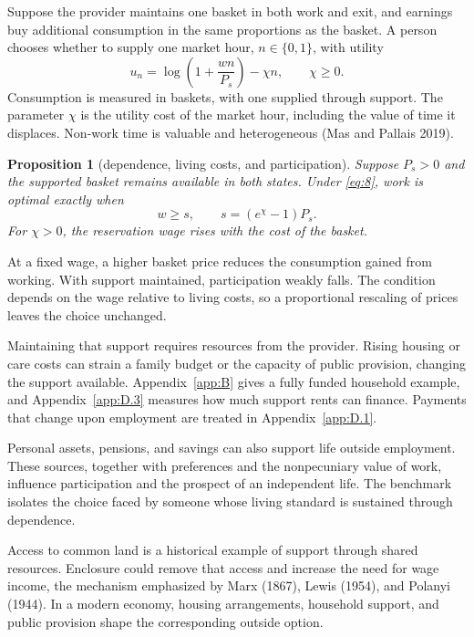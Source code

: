 \documentclass[12pt]{article}
\theoremstyle{plain}
\newtheorem{proposition}{Proposition}
\begin{document}
Suppose the provider maintains one basket in both work and exit, and earnings buy additional consumption in the same proportions as the basket. A person chooses whether to supply one market hour, $n\in\{0,1\}$, with utility
\begin{equation}\label{eq:8}
u_n = \log\left(1+\frac{wn}{P_s}\right) - \chi n,
\qquad
\chi\ge0.
\end{equation}
Consumption is measured in baskets, with one supplied through support. The parameter $\chi$ is the utility cost of the market hour, including the value of time it displaces. Non-work time is valuable and heterogeneous (Mas and Pallais 2019).

\begin{proposition}[dependence, living costs, and participation]\label{prop:3}
Suppose $P_s>0$ and the supported basket remains available in both states. Under \eqref{eq:8}, work is optimal exactly when
\begin{equation}\label{eq:9}
w \ge s,
\qquad
s = (e^{\chi}-1)P_s.
\end{equation}
For $\chi>0$, the reservation wage rises with the cost of the basket.
\end{proposition}

At a fixed wage, a higher basket price reduces the consumption gained from working. With support maintained, participation weakly falls. The condition depends on the wage relative to living costs, so a proportional rescaling of prices leaves the choice unchanged.

Maintaining that support requires resources from the provider. Rising housing or care costs can strain a family budget or the capacity of public provision, changing the support available. Appendix~\ref{app:B} gives a fully funded household example, and Appendix~\ref{app:D.3} measures how much support rents can finance. Payments that change upon employment are treated in Appendix~\ref{app:D.1}.

Personal assets, pensions, and savings can also support life outside employment. These sources, together with preferences and the nonpecuniary value of work, influence participation and the prospect of an independent life. The benchmark isolates the choice faced by someone whose living standard is sustained through dependence.

Access to common land is a historical example of support through shared resources. Enclosure could remove that access and increase the need for wage income, the mechanism emphasized by Marx (1867), Lewis (1954), and Polanyi (1944). In a modern economy, housing arrangements, household support, and public provision shape the corresponding outside option.
\end{document}
